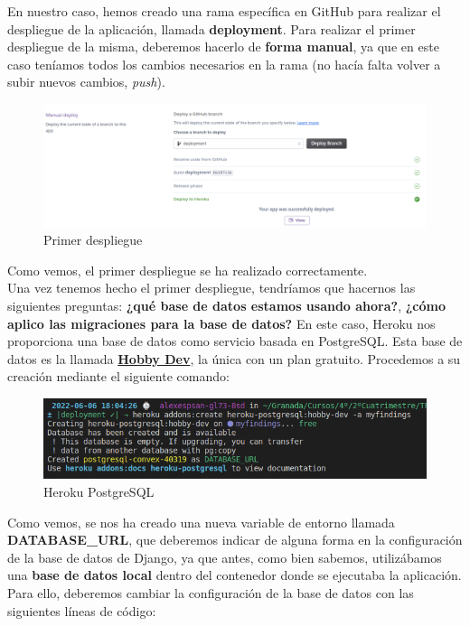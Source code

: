 En nuestro caso, hemos creado una rama específica en GitHub para realizar el despliegue de
la aplicación, llamada \textbf{deployment}. Para realizar el primer despliegue de la misma,
deberemos hacerlo de \textbf{forma manual}, ya que en este caso teníamos todos los cambios
necesarios en la rama (no hacía falta volver a subir nuevos cambios, \textit{push}).\\

    \begin{figure}[H]
        \centering
        \includegraphics[scale=0.30]{imagenes/first-deploy.png}
        \caption{Primer despliegue}
        \label{fig:first-deploy}
    \end{figure}

Como vemos, el primer despliegue se ha realizado correctamente.\\


Una vez tenemos hecho el primer despliegue, tendríamos que hacernos las siguientes
preguntas: \textbf{¿qué base de datos estamos usando ahora?}, \textbf{¿cómo aplico las
migraciones para la base de datos?} En este caso, Heroku nos proporciona una base de
datos como servicio basada en PostgreSQL. Esta base de datos es la llamada
\href{https://elements.heroku.com/addons/heroku-postgresql}{\textbf{Hobby Dev}}, la única
con un plan gratuito. Procedemos a su creación mediante el siguiente comando:

    \begin{figure}[H]
        \centering
        \includegraphics[scale=0.50]{imagenes/heroku-postgresql.png}
        \caption{Heroku PostgreSQL}
        \label{fig:heroku-postgresql}
    \end{figure}

Como vemos, se nos ha creado una nueva variable de entorno llamada \textbf{DATABASE\_URL},
que deberemos indicar de alguna forma en la configuración de la base de datos de Django,
ya que antes, como bien sabemos, utilizábamos una \textbf{base de datos local} dentro del
contenedor donde se ejecutaba la aplicación. Para ello, deberemos cambiar la configuración
de la base de datos con las siguientes líneas de código:


